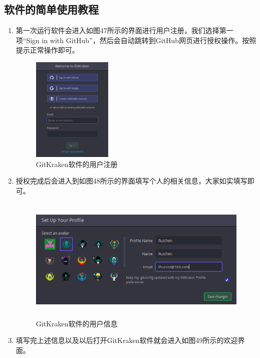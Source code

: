 \documentclass[a4paper,14pt]{article}
\begin{document}
\newpage
\subsection*{软件的简单使用教程}

\quad

\begin{enumerate}[1.]
    \item 第一次运行软件会进入如图47所示的界面进行用户注册，我们选择第一项“Sign in with GitHub”，然后会自动跳转到GitHub网页进行授权操作。按照提示正常操作即可。
    \begin{figure}[h]
        \centering
        \includegraphics[height=5cm]{figure/GitKraken_sign.png}
        \caption{GitKraken软件的用户注册}
    \end{figure}

    \quad

    \item 授权完成后会进入到如图48所示的界面填写个人的相关信息，大家如实填写即可。
    \begin{figure}[h]
        \centering
        \includegraphics[height=6cm]{figure/GitKraken_profile.png}
        \caption{GitKraken软件的用户信息}
    \end{figure}
    
    \item 填写完上述信息以及以后打开GitKraken软件就会进入如图49所示的欢迎界面。
    

\end{enumerate}
\end{document}
